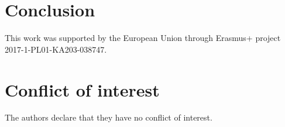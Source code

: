 \documentclass[twocolumn]{svjour3}          %
\begin{document}
\section{Conclusion}





\begin{acknowledgements}
This work was supported by the European Union through Erasmus+ project
2017-1-PL01-KA203-038747.
\end{acknowledgements}

\section*{Conflict of interest}
The authors declare that they have no conflict of interest.





\end{document}
